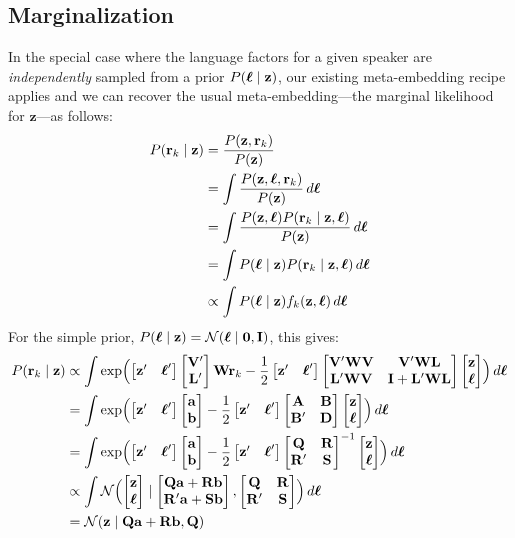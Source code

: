 \documentclass[a4paper,oneside,12pt,english]{report}
\def\Vmat{\mathbf{V}}
\def\zvec{\mathbf{z}}
\def\ND{\mathcal{N}}
\def\Lmat{\mathbf{L}}
\def\Bmat{\mathbf{B}}
\def\Wmat{\mathbf{W}}
\def\Dmat{\mathbf{D}}
\def\Smat{\mathbf{S}}
\def\Imat{\mathbf{I}}
\def\Rmat{\mathbf{R}}
\def\rvec{\mathbf{r}}
\def\avec{\mathbf{a}}
\def\bvec{\mathbf{b}}
\def\nulvec{\boldsymbol{0}}
\def\bmat#1{\begin{bmatrix}#1\end{bmatrix}}
\begin{document}
\subsection{Marginalization}
In the special case where the language factors for a given speaker are \emph{independently} sampled from a prior $P(\ellvec\mid\zvec)$, our existing meta-embedding recipe applies and we can recover the usual meta-embedding---the marginal likelihood for $\zvec$---as follows:
\begin{align}
\begin{split}
P(\rvec_k\mid\zvec) &= \frac{P(\zvec,\rvec_k)}{P(\zvec)} \\
&= \int \frac{P(\zvec,\ellvec,\rvec_k)}{P(\zvec)} \,d\ellvec \\
&= \int \frac{P(\zvec,\ellvec)P(\rvec_k\mid\zvec,\ellvec)}{P(\zvec)} \,d\ellvec \\
&= \int P(\ellvec\mid\zvec)P(\rvec_k\mid\zvec,\ellvec) \,d\ellvec \\
&\propto \int P(\ellvec\mid\zvec)f_k(\zvec,\ellvec) \,d\ellvec \\
\end{split}
\end{align} 
For the simple prior, $P(\ellvec\mid\zvec)=\ND(\ellvec\mid\nulvec,\Imat)$, this gives:
\begin{align}
\begin{split}
P(\rvec_k\mid\zvec) 
&\propto \int \exp\Bigl(
\bmat{\zvec'& \ellvec'}\bmat{\Vmat' \\ \Lmat'}\Wmat\rvec_k - \frac12\bmat{\zvec'& \ellvec'}
\bmat{\Vmat'\Wmat\Vmat & \Vmat'\Wmat\Lmat \\ \Lmat'\Wmat\Vmat & \Imat+\Lmat'\Wmat\Lmat}
\bmat{\zvec\\ \ellvec} 
\Bigr) \,d\ellvec \\
%
&= \int \exp\Bigl(
\bmat{\zvec'& \ellvec'}\bmat{\avec \\ \bvec} - \frac12\bmat{\zvec'& \ellvec'}
\bmat{\Amat & \Bmat \\ \Bmat' & \Dmat}
\bmat{\zvec\\ \ellvec} 
\Bigr) \,d\ellvec \\
%
&= \int \exp\Bigl(
\bmat{\zvec'& \ellvec'}\bmat{\avec \\ \bvec} - \frac12\bmat{\zvec'& \ellvec'}
\bmat{\Qmat & \Rmat \\ \Rmat' & \Smat}^{-1}
\bmat{\zvec\\ \ellvec} 
\Bigr) \,d\ellvec \\
%
%
&\propto \int \ND\Bigl(\bmat{\zvec \\ \ellvec}\mid \bmat{\Qmat\avec+\Rmat\bvec\\\Rmat'\avec+\Smat\bvec}, \bmat{\Qmat & \Rmat \\ \Rmat' & \Smat}\Bigr)
 \,d\ellvec \\
&=\ND(\zvec\mid \Qmat\avec+\Rmat\bvec, \Qmat)
\end{split}
\end{align} 
\end{document}
